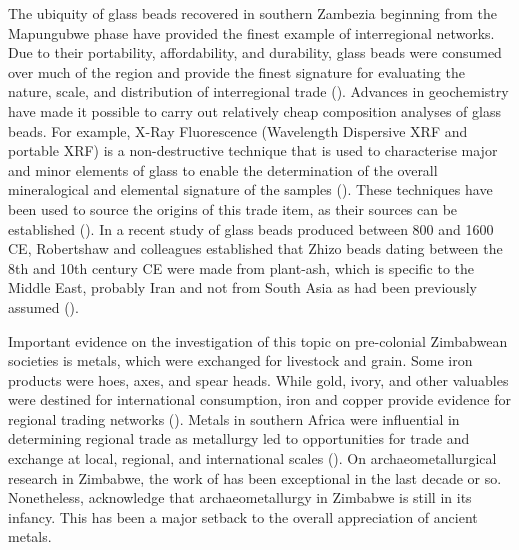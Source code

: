 The ubiquity of glass beads recovered in southern Zambezia beginning from the Mapungubwe phase have provided the finest example of interregional networks.  Due to their portability, affordability, and durability, glass beads were consumed over much of the region and provide the finest signature for evaluating the nature, scale, and distribution of interregional trade (\cite[][]{dussubieux2008}).  Advances in geochemistry have made it possible to carry out relatively cheap composition analyses of glass beads.  For example, X-Ray Fluorescence (Wavelength Dispersive XRF and portable XRF) is a non-destructive technique that is used to characterise major and minor elements of glass to enable the determination of the overall mineralogical and elemental signature of the samples (\cite[][245]{pernicka2014}). These techniques have been used to source the origins of this trade item, as their sources can be established (\cite[][]{wood2000}). In a recent study of glass beads produced between 800 and 1600 CE, Robertshaw and colleagues established that Zhizo beads dating between the 8th and 10th century CE were made from plant-ash, which is specific to the Middle East, probably Iran and not from South Asia as had been previously assumed (\cite[][]{robertshaw2010}).

Important evidence on the investigation of this topic on pre-colonial Zimbabwean societies is metals, which were exchanged for livestock and grain. Some iron products were hoes, axes, and spear heads. While gold, ivory, and other valuables were destined for international consumption, iron and copper provide evidence for regional trading networks (\cite[][13]{pikirayi2017}). Metals in southern Africa were influential in determining regional trade as metallurgy led to opportunities for trade and exchange at local, regional, and international scales (\cites[][]{chirikure2007}[][]{chirikure2013post}). On archaeometallurgical research in Zimbabwe, the work of
\citeauthor{chirikure2005}
has been exceptional in the last decade or so. Nonetheless, \textcite[][152]{chirikure2013post} acknowledge that archaeometallurgy in Zimbabwe is still in its infancy. This has been a major setback to the overall appreciation of ancient metals.

